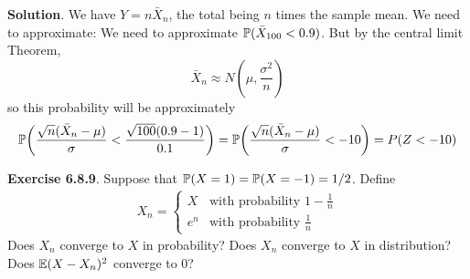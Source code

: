 \textbf{Solution}. We have \(Y = n \bar{X}_{n}\), the total being
\(n\) times the sample mean. We need to approximate:
We need to approximate \(\operatorname{\mathbb{P}}(\bar{X}_{100} < 0.9)\). But by
the central limit Theorem,
\[
\bar{X}_{n} \approx N\left(\mu, \frac{\sigma^{2}}{n}\right)
\]
so this probability will be approximately \[
\PROB\left(\frac{\sqrt{n}(\bar{X}_{n} - \mu)}{\sigma} < \frac{\sqrt{100}(0.9 - 1)}{0.1}\right) 
= \PROB\left(\frac{\sqrt{n}(\bar{X}_{n} - \mu)}{\sigma} < -10 \right) 
= P(Z < -10)
\]

\textbf{Exercise 6.8.9}. Suppose that
\(\operatorname{\mathbb{P}}(X = 1) = \operatorname{\mathbb{P}}(X = -1) = 1/2\). Define
\begin{align*}  X_{n} =
    \begin{cases}
      X   & \text{with probability } 1 - \frac{1}{n}\\
      e^{n} & \text{with probability } \frac{1}{n}
    \end{cases}       
\end{align*}
Does \(X_{n}\) converge to \(X\) in probability? Does \(X_{n}\) converge to
\(X\) in distribution? Does \(\operatorname{\mathbb{E}}(X - X_{n})^{2}\) converge to 0?

